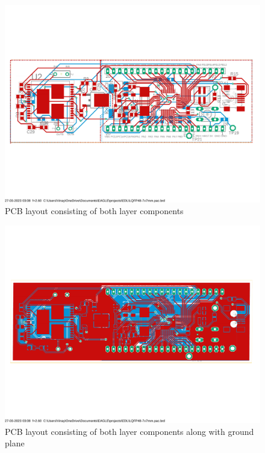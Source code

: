 \documentclass{article}
\begin{document}
\begin{figure}[htp]
    \centering
    \includegraphics[width=\textwidth]{Images/ourpcbboth.pdf}
    \caption{PCB layout consisting of both layer components}
    \label{fig:galaxy}
\end{figure}


\begin{figure}[htp]
    \centering
    \includegraphics[width=\textwidth]{Images/ourpcbwithgplane.pdf}
    \caption{PCB layout consisting of both layer components along with ground plane}
    \label{fig:galaxy}
\end{figure}
\end{document}
